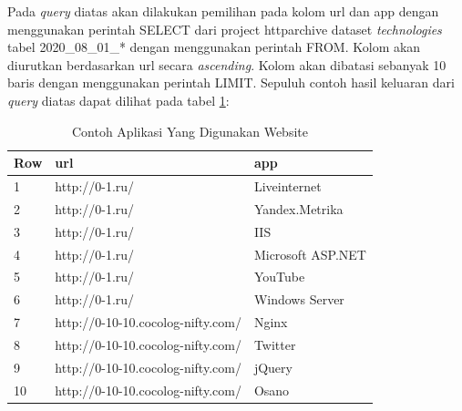 Pada \textit{query} diatas akan dilakukan pemilihan pada kolom url dan app dengan menggunakan perintah SELECT dari project httparchive dataset \textit{technologies} tabel 2020\_08\_01\_* dengan menggunakan perintah FROM. Kolom akan diurutkan berdasarkan url secara \textit{ascending}. Kolom akan dibatasi sebanyak 10 baris dengan menggunakan perintah LIMIT. Sepuluh contoh hasil keluaran dari \textit{query} diatas dapat dilihat pada tabel \ref{table:contoh_langkah2}:

\begin{table}[H]
\centering
\begin{tabular}{|l|l|l|}
	\hline
	\textbf{Row} & \textbf{url} & \textbf{app}\\
	\hline
	1 & http://0-1.ru/ & Liveinternet\\
	\hline
	2 & http://0-1.ru/ & Yandex.Metrika\\
	\hline
	3 & http://0-1.ru/ & IIS\\
	\hline
	4 & http://0-1.ru/ & Microsoft ASP.NET\\
	\hline
	5 & http://0-1.ru/ & YouTube\\
	\hline
	6 & http://0-1.ru/ & Windows Server\\
	\hline
	7 & 	
	http://0-10-10.cocolog-nifty.com/  & 	
	Nginx \\
	\hline
	8 & 	
	http://0-10-10.cocolog-nifty.com/  & Twitter\\
	\hline
	9 & 	
	http://0-10-10.cocolog-nifty.com/  & jQuery\\
	\hline
	10 & 	
	http://0-10-10.cocolog-nifty.com/  & Osano\\
	\hline
\end{tabular}
\caption{Contoh Aplikasi Yang Digunakan Website}
\label{table:contoh_langkah2}
\end{table}

